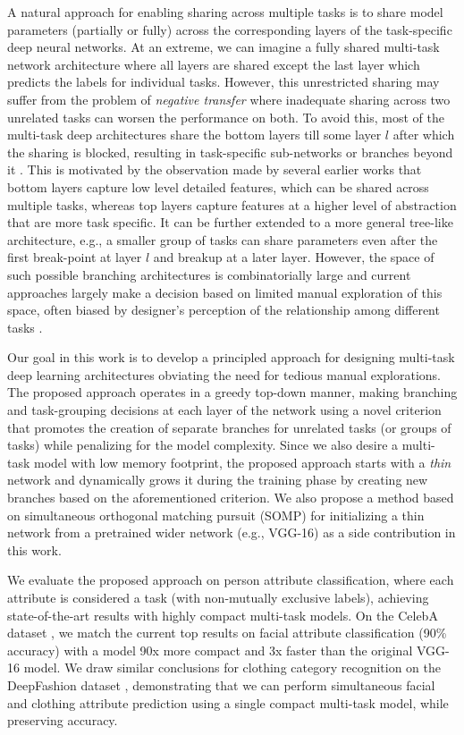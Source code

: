 \documentclass[10pt,twocolumn,letterpaper]{article}
\begin{document}
A natural approach for enabling sharing across multiple tasks is to share model parameters (partially or fully) across 
the corresponding layers of the task-specific deep neural networks. At an extreme, we can imagine 
a fully shared multi-task network architecture where all layers are shared except the last layer 
which predicts the labels for individual tasks. However, this unrestricted
sharing may suffer from the problem of \emph{negative transfer} where inadequate sharing across 
two unrelated tasks can worsen the performance on both. To avoid this, most of the multi-task
deep architectures share the bottom layers till some layer $l$ after which the sharing is blocked, 
resulting in task-specific sub-networks or branches beyond it \cite{HyperFace16,Brendan16,huang2015cross}. 
This is motivated by the observation made by several earlier works that bottom layers capture 
low level detailed features, which can be shared across multiple tasks, whereas top
layers capture features at a higher level of abstraction that are more task specific.
It can be further extended to a more general tree-like architecture, e.g., a smaller group of tasks can share 
parameters even after the first break-point at layer $l$ and breakup at a later layer.   
However, the space of such possible branching architectures is combinatorially large and current approaches 
largely make a decision based on limited manual exploration of this space, often biased by designer's perception of the 
relationship among different tasks \cite{Misra16}.

Our goal in this work is to develop a principled approach for designing multi-task deep learning
architectures obviating the need for tedious manual explorations. The proposed approach operates in a greedy
top-down manner, making branching and task-grouping decisions at each layer of the network using
a novel criterion that promotes the creation of separate branches for unrelated tasks (or groups of tasks) while 
penalizing for the model complexity. Since we also desire  a multi-task model with low memory 
footprint, the proposed approach starts with a \emph{thin} network and dynamically grows it
during the training phase by creating new branches based on the aforementioned criterion. 
We also propose a method based on simultaneous orthogonal matching pursuit (SOMP) \cite{somp}
for initializing a thin network from a pretrained wider network
(e.g., VGG-16) as a side contribution in this work.  

We evaluate the proposed approach on person attribute classification, where each attribute is considered a task (with non-mutually exclusive labels),
achieving state-of-the-art results with highly compact multi-task models.
On the CelebA dataset \cite{liu2015deep}, we match the current top results on facial attribute classification (90\% accuracy) with a model 90x more compact and 3x faster than the original VGG-16 model. We draw similar conclusions for clothing category recognition on the DeepFashion dataset \cite{liu2016deepfashion}, demonstrating that we can perform simultaneous facial and clothing attribute prediction using a single compact multi-task model, while preserving accuracy.
\end{document}

